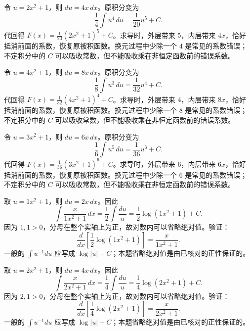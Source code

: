 \documentclass[12pt,fontset=fandol]{ctexart}
\begin{document}
\begin{solve}\label{ans:c12q4}
令 $u=2x^2+1$，则 $du=4x\,dx$。原积分变为
\[
\frac1{4}\int u^{4}\,du=\frac{1}{20}u^{5}+C.
\]
代回得 $F(x)=\frac{1}{20}(2x^2+1)^{5}+C$。求导时，外层带来 $5$，内层带来 $4x$，恰好抵消前面的系数，恢复原被积函数。换元过程中少除一个 $4$ 是常见的系数错误；不定积分中的 $C$ 可以吸收常数，但不能吸收乘在非恒定函数前的错误系数。
\end{solve}

\begin{solve}\label{ans:c12q5}
令 $u=4x^2+1$，则 $du=8x\,dx$。原积分变为
\[
\frac1{8}\int u^{3}\,du=\frac{1}{32}u^{4}+C.
\]
代回得 $F(x)=\frac{1}{32}(4x^2+1)^{4}+C$。求导时，外层带来 $4$，内层带来 $8x$，恰好抵消前面的系数，恢复原被积函数。换元过程中少除一个 $8$ 是常见的系数错误；不定积分中的 $C$ 可以吸收常数，但不能吸收乘在非恒定函数前的错误系数。
\end{solve}

\begin{solve}\label{ans:c12q6}
令 $u=3x^2+1$，则 $du=6x\,dx$。原积分变为
\[
\frac1{6}\int u^{5}\,du=\frac{1}{36}u^{6}+C.
\]
代回得 $F(x)=\frac{1}{36}(3x^2+1)^{6}+C$。求导时，外层带来 $6$，内层带来 $6x$，恰好抵消前面的系数，恢复原被积函数。换元过程中少除一个 $6$ 是常见的系数错误；不定积分中的 $C$ 可以吸收常数，但不能吸收乘在非恒定函数前的错误系数。
\end{solve}

\begin{solve}\label{ans:c12q7}
取 $u=1x^2+1$，则 $du=2x\,dx$。因此
\[
\int\frac{x}{1x^2+1}\,dx=\frac{1}{2}\int\frac{du}u=\frac{1}{2}\log(1x^2+1)+C.
\]
因为 $1,1>0$，分母在整个实轴上为正，故对数内可以省略绝对值。验证：
\[
\frac d{dx}\left[\frac{1}{2}\log(1x^2+1)\right]=\frac{x}{1x^2+1}.
\]
一般的 $\int u^{-1}du$ 应写成 $\log|u|+C$；本题省略绝对值是由已核对的正性保证的。
\end{solve}

\begin{solve}\label{ans:c12q8}
取 $u=2x^2+1$，则 $du=4x\,dx$。因此
\[
\int\frac{x}{2x^2+1}\,dx=\frac{1}{4}\int\frac{du}u=\frac{1}{4}\log(2x^2+1)+C.
\]
因为 $2,1>0$，分母在整个实轴上为正，故对数内可以省略绝对值。验证：
\[
\frac d{dx}\left[\frac{1}{4}\log(2x^2+1)\right]=\frac{x}{2x^2+1}.
\]
一般的 $\int u^{-1}du$ 应写成 $\log|u|+C$；本题省略绝对值是由已核对的正性保证的。
\end{solve}
\end{document}
